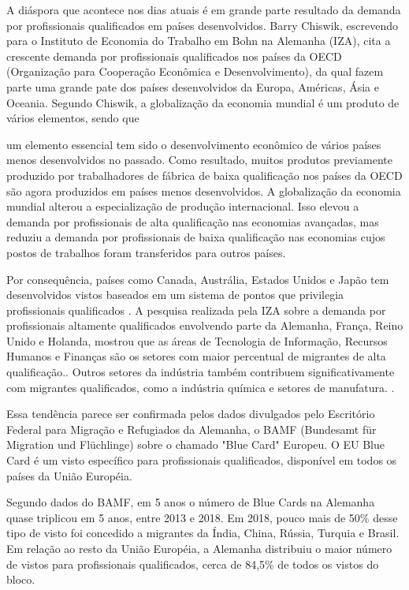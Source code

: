 \documentclass[
	12pt,				%
	openright,			%
	twoside,			%
	a4paper,			%
	english,			%
	french,				%
	spanish,			%
	brazil				%
	]{abntex2}
\begin{document}
A diáspora que acontece nos dias atuais é em grande parte resultado da demanda por profissionais qualificados em países desenvolvidos. Barry Chiswik, escrevendo para o Instituto de Economia do Trabalho em Bohn na Alemanha (IZA), cita a crescente demanda por profissionais qualificados nos países da OECD (Organização para Cooperação Econômica e Desenvolvimento), da qual fazem parte uma grande pate dos países desenvolvidos da Europa, Américas, Ásia e Oceania. Segundo Chiswik, a globalização da economia mundial é um produto de vários elementos, sendo que \begin{citacao} um elemento essencial tem sido o desenvolvimento econômico de vários países menos desenvolvidos no passado. Como resultado, muitos produtos previamente produzido por trabalhadores de fábrica de baixa qualificação nos países da OECD são agora produzidos em países menos desenvolvidos. A globalização da economia mundial alterou a especialização de produção internacional. Isso elevou a demanda por profissionais de alta qualificação nas economias avançadas, mas reduziu a demanda por profissionais de baixa qualificação nas economias cujos postos de trabalhos foram transferidos para outros países. \end{citacao}\cite[3]{chiswick}

Por consequência, países como Canada, Austrália, Estados Unidos e Japão tem desenvolvidos vistos baseados em um sistema de pontos que privilegia profissionais qualificados \cite[6]{chiswick}. A pesquisa realizada pela IZA sobre a demanda por profissionais altamente qualificados envolvendo parte da Alemanha, França, Reino Unido e Holanda, mostrou que as áreas de Tecnologia de Informação,  Recursos Humanos e Finanças são os setores com maior percentual de migrantes de alta qualificação.\cite[7]{thomas_bauer}. Outros setores da indústria também contribuem significativamente com migrantes qualificados, como a indústria química e setores de manufatura. \cite[18]{thomas_bauer}.

Essa tendência parece ser confirmada pelos dados divulgados pelo Escritório Federal para Migração e Refugiados da Alemanha, o BAMF (Bundesamt für Migration und Flüchlinge) sobre o chamado "Blue Card" Europeu. O EU Blue Card é um visto específico para profissionais qualificados, disponível em todos os países da União Européia.

Segundo dados do BAMF, em 5 anos o número de Blue Cards na Alemanha quase triplicou em 5 anos, entre 2013 e 2018. Em 2018, pouco mais de 50\% desse tipo de visto foi concedido a migrantes da Índia, China, Rússia, Turquia e Brasil. Em relação ao resto da União Européia, a Alemanha distribuiu o maior número de vistos para profissionais qualificados, cerca de 84,5\% de todos os vistos do bloco. \cite{bamf}
\end{document}
